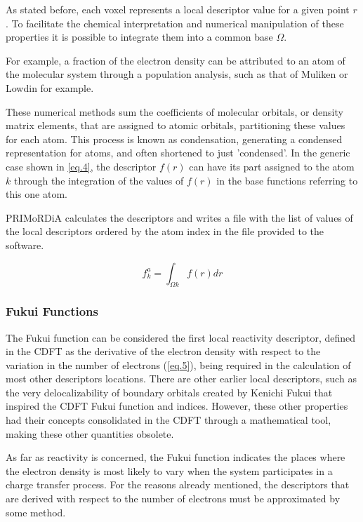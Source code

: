 \documentclass[a4paper,11pt]{refart}
\begin{document}
	As stated before, each voxel represents a local descriptor value for a given point $r$. To facilitate the chemical interpretation and numerical manipulation of these properties it is possible to integrate them into a common base $\Omega$. 

	For example, a fraction of the electron density can be attributed to an atom of the molecular system through a population analysis, such as that of Muliken or Lowdin for example. 

	These numerical methods sum the coefficients of molecular orbitals, or density matrix elements, that are assigned to atomic orbitals, partitioning these values for each atom. This process is known as condensation, generating a condensed representation for atoms, and often shortened to just 'condensed'. In the generic case shown in \autoref{eq.4}, the descriptor $f(r)$ can have its part assigned to the atom $k$ through the integration of the values of $f(r)$ in the base functions referring to this one atom.

	PRIMoRDiA calculates the descriptors and writes a file with the list of values of the local descriptors ordered by the atom index in the file provided to the software.

	\begin{equation}
	f_k^{a} = \int_{\Omega k} f(r)dr
	\label{eq.4}
	\end{equation} 

	\subsubsection{Fukui Functions} 

	The Fukui function can be considered the first local reactivity descriptor, defined in the CDFT as the derivative of the electron density with respect to the variation in the number of electrons (\autoref{eq.5}), being required in the calculation of most other descriptors locations. There are other earlier local descriptors, such as the very delocalizability of boundary orbitals created by Kenichi Fukui that inspired the CDFT\cite{fukui1970theory} Fukui function and indices. However, these other properties had their concepts consolidated in the CDFT through a mathematical tool, making these other quantities obsolete.

	As far as reactivity is concerned, the Fukui function indicates the places where the electron density is most likely to vary when the system participates in a charge transfer process. For the reasons already mentioned, the descriptors that are derived with respect to the number of electrons must be approximated by some method. 
\end{document}
